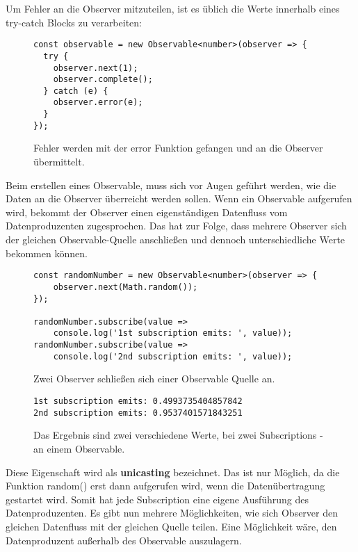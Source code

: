 \noindent
Um Fehler an die Observer mitzuteilen, ist es üblich die Werte innerhalb eines try-catch Blocks zu verarbeiten:

\begin{figure}[H]
\begin{lstlisting}[basicstyle=\small]
const observable = new Observable<number>(observer => {
  try {
    observer.next(1);
    observer.complete();
  } catch (e) {
    observer.error(e);
  }
});
\end{lstlisting}
\caption{Fehler werden mit der error Funktion gefangen und an die Observer übermittelt.}
\label{catch-error-obs}
\end{figure}

\noindent
Beim erstellen eines Observable, muss sich vor Augen geführt werden, wie die Daten an die Observer überreicht werden sollen. Wenn ein Observable aufgerufen wird, bekommt der Observer einen eigenständigen Datenfluss vom Datenproduzenten zugesprochen. Das hat zur Folge, dass mehrere Observer sich der gleichen Observable-Quelle anschließen und dennoch unterschiedliche Werte bekommen können.

\begin{figure}[H]
\begin{lstlisting}[basicstyle=\small]
const randomNumber = new Observable<number>(observer => {
    observer.next(Math.random());
});

randomNumber.subscribe(value =>
    console.log('1st subscription emits: ', value));
randomNumber.subscribe(value =>
    console.log('2nd subscription emits: ', value));
\end{lstlisting}
\caption{Zwei Observer schließen sich einer Observable Quelle an.}
\end{figure}

\begin{figure}[H]
\begin{lstlisting}
1st subscription emits: 0.4993735404857842
2nd subscription emits: 0.9537401571843251
\end{lstlisting}
\caption{Das Ergebnis sind zwei verschiedene Werte, bei zwei Subscriptions - an einem Observable.}
\end{figure}

\noindent
Diese Eigenschaft wird als \textbf{unicasting} bezeichnet. Das ist nur Möglich, da die Funktion random() erst dann aufgerufen wird, wenn die Datenübertragung gestartet wird. Somit hat jede Subscription eine eigene Ausführung des Datenproduzenten. Es gibt nun mehrere Möglichkeiten, wie sich Observer den gleichen Datenfluss mit der gleichen Quelle teilen. Eine Möglichkeit wäre, den Datenproduzent außerhalb des Observable auszulagern. 

